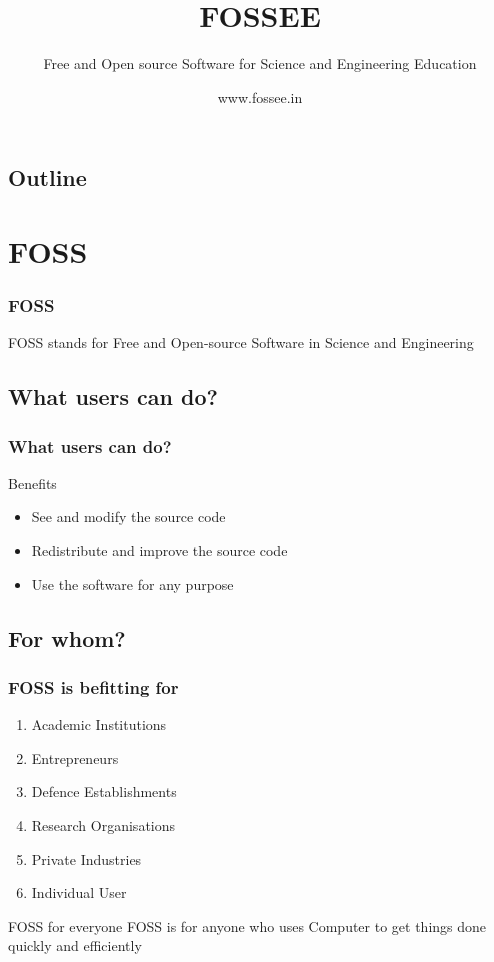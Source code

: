 \documentclass[compress,red]{beamer} %
\title{FOSSEE}
\subtitle{Free and Open source Software for Science and Engineering
Education}
\author[]{www.fossee.in}  %
\institute{IIT Bombay}
\date[]{} %
\begin{document}
\begin{frame}
	 \titlepage
\end{frame}

\begin{frame}
\section*{Outline}
\tableofcontents
\end{frame}


\section{FOSS}
\begin{frame}
\frametitle{FOSS}
\begin{definition}
\alert{FOSS} stands for Free and Open-source Software in Science and Engineering
\end{definition}
\end{frame}

\subsection{What users can do?}
\begin{frame}
\frametitle{What users can do?}
\begin{block}{Benefits}
\begin{itemize}
\item See and modify the source code \pause
\item Redistribute and improve the source code \pause
\item Use the software for any purpose 
\end{itemize}
\end{block}
\end{frame}

\subsection{For whom?}
\begin{frame}
\frametitle{FOSS is befitting for}
\begin{enumerate}
\item Academic Institutions\pause
\item Entrepreneurs \pause
\item Defence Establishments \pause
\item Research Organisations \pause
\item Private Industries \pause
\item Individual User \pause
\end{enumerate}
\begin{block}{FOSS for everyone} \pause
FOSS is for anyone who uses Computer to get things done quickly and efficiently
\end{block}
\end{frame}
\end{document}
